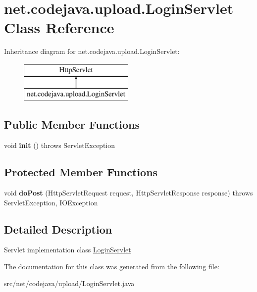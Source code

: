 \hypertarget{classnet_1_1codejava_1_1upload_1_1_login_servlet}{\section{net.\+codejava.\+upload.\+Login\+Servlet Class Reference}
\label{classnet_1_1codejava_1_1upload_1_1_login_servlet}
}
Inheritance diagram for net.\+codejava.\+upload.\+Login\+Servlet\+:\begin{figure}[H]
\begin{center}
\leavevmode
\includegraphics[height=2.000000cm]{classnet_1_1codejava_1_1upload_1_1_login_servlet}
\end{center}
\end{figure}
\subsection*{Public Member Functions}
\begin{DoxyCompactItemize}
\item 
\hypertarget{classnet_1_1codejava_1_1upload_1_1_login_servlet_a0d539906576aaa5dc1b7f9ab96eac5e7}{void {\bfseries init} ()  throws Servlet\+Exception }\label{classnet_1_1codejava_1_1upload_1_1_login_servlet_a0d539906576aaa5dc1b7f9ab96eac5e7}

\end{DoxyCompactItemize}
\subsection*{Protected Member Functions}
\begin{DoxyCompactItemize}
\item 
\hypertarget{classnet_1_1codejava_1_1upload_1_1_login_servlet_a220b854e04ba4a0eae16512cbdb344c8}{void {\bfseries do\+Post} (Http\+Servlet\+Request request, Http\+Servlet\+Response response)  throws Servlet\+Exception, I\+O\+Exception }\label{classnet_1_1codejava_1_1upload_1_1_login_servlet_a220b854e04ba4a0eae16512cbdb344c8}

\end{DoxyCompactItemize}


\subsection{Detailed Description}
Servlet implementation class \hyperlink{classnet_1_1codejava_1_1upload_1_1_login_servlet}{Login\+Servlet} 

The documentation for this class was generated from the following file\+:\begin{DoxyCompactItemize}
\item 
src/net/codejava/upload/Login\+Servlet.\+java\end{DoxyCompactItemize}
